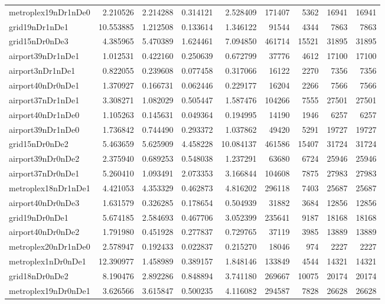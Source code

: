 \begin{longtable}{|l|r|r|r|r|r|r|r|r|}
metroplex19nDr1nDe0 & 2.210526 & 2.214288 & 0.314121 & 2.528409 & 171407 & 5362 & 16941 & 16941 \\
grid19nDr1nDe1 & 10.553885 & 1.212508 & 0.133614 & 1.346122 & 91544 & 4344 & 7863 & 7863 \\
grid15nDr0nDe3 & 4.385965 & 5.470389 & 1.624461 & 7.094850 & 461714 & 15521 & 31895 & 31895 \\
airport39nDr1nDe1 & 1.012531 & 0.422160 & 0.250639 & 0.672799 & 37776 & 4612 & 17100 & 17100 \\
airport3nDr1nDe1 & 0.822055 & 0.239608 & 0.077458 & 0.317066 & 16122 & 2270 & 7356 & 7356 \\
airport40nDr0nDe1 & 1.370927 & 0.166731 & 0.062446 & 0.229177 & 16204 & 2266 & 7566 & 7566 \\
airport37nDr1nDe1 & 3.308271 & 1.082029 & 0.505447 & 1.587476 & 104266 & 7555 & 27501 & 27501 \\
airport40nDr1nDe0 & 1.105263 & 0.145631 & 0.049364 & 0.194995 & 14190 & 1946 & 6257 & 6257 \\
airport39nDr1nDe0 & 1.736842 & 0.744490 & 0.293372 & 1.037862 & 49420 & 5291 & 19727 & 19727 \\
grid15nDr0nDe2 & 5.463659 & 5.625909 & 4.458228 & 10.084137 & 461586 & 15407 & 31724 & 31724 \\
airport39nDr0nDe2 & 2.375940 & 0.689253 & 0.548038 & 1.237291 & 63680 & 6724 & 25946 & 25946 \\
airport37nDr0nDe1 & 5.260410 & 1.093491 & 2.073353 & 3.166844 & 104608 & 7875 & 27983 & 27983 \\
metroplex18nDr1nDe1 & 4.421053 & 4.353329 & 0.462873 & 4.816202 & 296118 & 7403 & 25687 & 25687 \\
airport40nDr0nDe3 & 1.631579 & 0.326285 & 0.178654 & 0.504939 & 31882 & 3684 & 12856 & 12856 \\
grid19nDr0nDe1 & 5.674185 & 2.584693 & 0.467706 & 3.052399 & 235641 & 9187 & 18168 & 18168 \\
airport40nDr0nDe2 & 1.791980 & 0.451928 & 0.277837 & 0.729765 & 37119 & 3985 & 13889 & 13889 \\
metroplex20nDr1nDe0 & 2.578947 & 0.192433 & 0.022837 & 0.215270 & 18046 & 974 & 2227 & 2227 \\
metroplex1nDr0nDe1 & 12.390977 & 1.458989 & 0.389157 & 1.848146 & 133849 & 4544 & 14321 & 14321 \\
grid18nDr0nDe2 & 8.190476 & 2.892286 & 0.848894 & 3.741180 & 269667 & 10075 & 20174 & 20174 \\
metroplex19nDr0nDe1 & 3.626566 & 3.615847 & 0.500235 & 4.116082 & 294587 & 7828 & 26628 & 26628 \\

\end{longtable}
